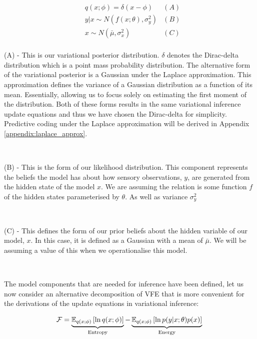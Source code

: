 \documentclass{article}
\begin{document}
\begin{equation}\label{eq:pc_single_model}
    \begin{aligned}
        & q(x ; \phi) = \delta( x - \phi ) &(A) \\
        & y | x \sim N(f(x	; \theta), \sigma^2_y) &(B) \\
        & x \sim N(\bar{\mu}, \sigma^2_x) &(C) \\ 
    \end{aligned}
\end{equation}

(A) - This is our variational posterior distribution. $\delta$ denotes the Dirac-delta distribution which is a point mass probability distribution. The alternative form of the variational posterior is a Gaussian under the Laplace approximation. \cite{friston2003learning} This approximation defines the variance of a Gaussian distribution as a function of its mean. Essentially, allowing us to focus solely on estimating the first moment of the distribution. Both of these forms results in the same variational inference update equations and thus we have chosen the Dirac-delta for simplicity. Predictive coding under the Laplace approximation will be derived in Appendix \ref{appendix:laplace_approx}. 

\

(B) - This is the form of our likelihood distribution. This component represents the beliefs the model has about how sensory observations, $y$, are generated from the hidden state of the model $x$. We are assuming the relation is some function $f$ of the hidden states parameterised by $\theta$. As well as variance $\sigma_y^2$

\

(C) - This defines the form of our prior beliefs about the hidden variable of our model, $x$. In this case, it is defined as a Gaussian with a mean of $\bar{\mu}$. We will be assuming a value of this when we operationalise this model.

\

The model components that are needed for inference have been defined, let us now consider an alternative decomposition of VFE that is more convenient for the derivations of the update equations in variational inference:

\begin{equation}\label{eq:vfe_entropy_energy}
	\mathcal{F} = \underbrace{\mathbb{E}_{q(x ; \phi)} \left[ 	\ln q(x ; \phi) \right]}_{\text{Entropy}} - \underbrace{\mathbb{E}_{q(x ; \phi)} \left[ 	\ln p(y | x ; \theta) p(x) \right]}_{\text{Energy}} \\
\end{equation}
\end{document}
